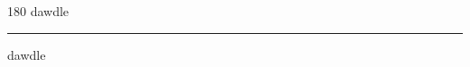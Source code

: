 
\begin{frame}
\begin{center}
\begin{turn}{180}
{\fontsize{2.5cm}{1em}\selectfont dawdle}
\end{turn}
\vspace{1em}\par  
\hrule
\vspace{1em}\par  
{\fontsize{2.5cm}{1em}\selectfont dawdle}
\end{center}
\end{frame}
